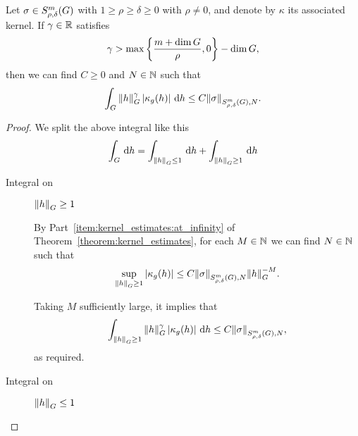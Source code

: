 \begin{lemma}
\label{lemma:integrability_of_kernel}
    Let $\sigma \in \SymbolClass m {\rho, \delta}$ with $1 \geq \rho \geq \delta \geq 0$ with $\rho \neq 0$,
    and denote by $\kappa$ its associated kernel.
    If $\gamma \in \R$ satisfies
    \begin{align*}
        \gamma > \max \left\{\frac {m + \dim \Group} \rho, 0\right\} - \dim \Group,
    \end{align*}
    then we can find $C \geq 0$ and $N \in \N$ such that
    \begin{align*}
        \int_\Group \norm [\Group] h^\gamma \abs {\kappa_g(h)} \dd h
        \leq C \SymbolSemiNorm m {\rho, \delta} N \sigma.
    \end{align*}
\end{lemma}
\begin{proof}
    We split the above integral like this
    \begin{align*}
        \int_\Group \dd h
        = \int_{\norm [\Group] h \leq 1} \dd h
        + \int_{\norm [\Group] h \geq 1} \dd h
    \end{align*}

    \begin{description}
        \item [Integral on] $\norm [\Group] h \geq 1$

            By Part~\eqref{item:kernel_estimates:at_infinity} of
            Theorem~\ref{theorem:kernel_estimates},
            for each $M \in \N$ we can find $N \in \N$ such that
            \begin{align*}
                \sup_{\norm [\Group] {h} \geq 1} \abs {\kappa_g(h)}
                \leq C \SymbolSemiNorm m {\rho, \delta} N \sigma \norm [\Group] h^{-M}.
            \end{align*}

            Taking $M$ sufficiently large, it implies that
            \begin{align*}
                \int_{\norm [\Group] h \geq 1} \norm [\Group] h^\gamma \abs {\kappa_g(h)} \dd h
                \leq C \SymbolSemiNorm m {\rho, \delta} N \sigma,
            \end{align*}
            as required.

        \item [Integral on] $\norm [\Group] h \leq 1$


\end{description}
\end{proof}

